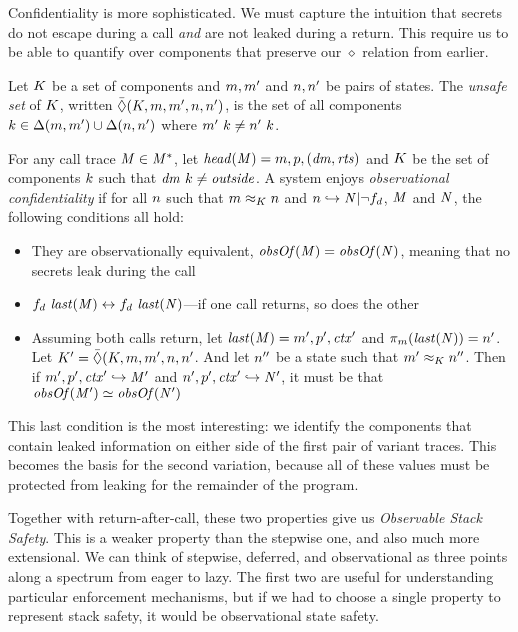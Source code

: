 \documentclass[acmsmall,review,anonymous]{acmart}\settopmatter{printfolios=true,printccs=false,printacmref=false}
\begin{document}
\medskip

Confidentiality is more sophisticated. We must capture the intuition that
secrets do not escape during a call {\em and} are not leaked during a return.
This require us to be able to quantify over components that preserve our \(\diamond\)
relation from earlier.

 Let \(K\) be a set of components and \(m,m'\) and \(n,n'\)
be pairs of states. The {\em unsafe set} of \(K\), written
\(\bar{\Diamond}(K,m,m',n,n')\), is the set of all components
\(k \in \Delta(m,m') \cup \Delta(n,n')\) where
\(m' ~ k \not = n' ~ k\).

For any call trace \(\mathit{M} \in \mathit{M}^*\),
let \(\mathit{head}(\mathit{M}) = m,p,(\mathit{dm},\mathit{rts})\) and
\(K\) be the set of components \(k\)
such that \(\mathit{dm} ~ k \not = \mathit{outside}\).
%
A system enjoys {\em observational confidentiality} if for all
\(n\) such that \(m \approx_K n\) and
\(n \hookrightarrow \mathit{N} | \neg f_d \),
\(\mathit{M}\) and \(\mathit{N}\), the following conditions all hold:

\begin{itemize}
\item They are observationally equivalent, \(\mathit{obsOf}(\mathit{M}) = \mathit{obsOf}(\mathit{N})\),
  meaning that no secrets leak during the call
\item \(f_d ~ \mathit{last}(\mathit{M}) \leftrightarrow f_d ~
\mathit{last}(\mathit{N})\)---if one call returns, so does the other
\item Assuming both calls return, let \(\mathit{last}(\mathit{M}) = m',p',\mathit{ctx}'\)
  and \(\pi_m(\mathit{last}(\mathit{N})) = n'\).
  Let \(K' = \bar{\Diamond}(K,m,m',n,n'\).
  And let \(n''\) be a state such that \(m' \approx_K n''\).
  Then if \(m',p',\mathit{ctx}' \hookrightarrow \mathit{M}'\) and
  \(n',p',\mathit{ctx}' \hookrightarrow \mathit{N}'\), it must be
  that \(\mathit{obsOf}(\mathit{M}') \simeq \mathit{obsOf}(\mathit{N}')\)
\end{itemize}

This last condition is the most interesting: we identify the components that
contain leaked information on either side of the first pair of variant traces.
This becomes the basis for the second variation, because all of these values
must be protected from leaking for the remainder of the program.

Together with return-after-call, these two properties give us
{\em Observable Stack Safety}. This is a weaker property
than the stepwise one, and also much more extensional.
We can think of stepwise, deferred, and observational as
three points along a spectrum from eager to lazy. The first two
are useful for understanding particular enforcement mechanisms,
but if we had to choose a single property to represent stack safety,
it would be observational state safety.
\end{document}

